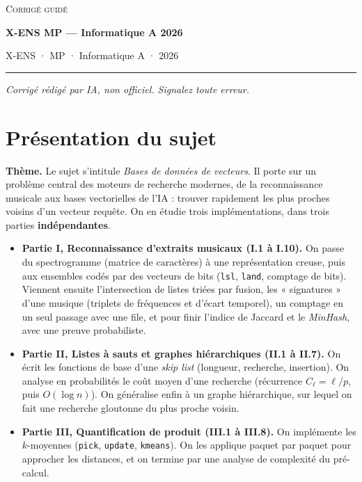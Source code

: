 \documentclass[11pt,a4paper]{article}
\providecommand{\tightlist}{\setlength{\itemsep}{0pt}\setlength{\parskip}{0pt}}
\begin{document}
\thispagestyle{plain}
\begin{center}
  {\small\scshape Corrigé guidé}\par\smallskip
  {\LARGE\bfseries X-ENS MP — Informatique A 2026\par}\medskip
  {\large X-ENS · MP · Informatique A · 2026\par}
\end{center}
\vspace{2pt}\hrule\vspace{8pt}

\emph{Corrigé rédigé par IA, non officiel. Signalez toute erreur.}

\hypertarget{pruxe9sentation-du-sujet}{%
\section{Présentation du sujet}\label{pruxe9sentation-du-sujet}}

\textbf{Thème.} Le sujet s'intitule \emph{Bases de données de vecteurs}. Il porte sur un problème central des moteurs de recherche modernes, de la reconnaissance musicale aux bases vectorielles de l'IA : trouver rapidement les plus proches voisins d'un vecteur requête. On en étudie trois implémentations, dans trois parties \textbf{indépendantes}.

\begin{itemize}
\tightlist
\item
  \textbf{Partie I, Reconnaissance d'extraits musicaux (I.1 à I.10).} On passe du spectrogramme (matrice de caractères) à une représentation creuse, puis aux ensembles codés par des vecteurs de bits (\texttt{lsl}, \texttt{land}, comptage de bits). Viennent ensuite l'intersection de listes triées par fusion, les « signatures » d'une musique (triplets de fréquences et d'écart temporel), un comptage en un seul passage avec une file, et pour finir l'indice de Jaccard et le \emph{MinHash}, avec une preuve probabiliste.
\item
  \textbf{Partie II, Listes à sauts et graphes hiérarchiques (II.1 à II.7).} On écrit les fonctions de base d'une \emph{skip list} (longueur, recherche, insertion). On analyse en probabilités le coût moyen d'une recherche (récurrence \(C_\ell=\ell/p\), puis \(O(\log n)\)). On généralise enfin à un graphe hiérarchique, sur lequel on fait une recherche gloutonne du plus proche voisin.
\item
  \textbf{Partie III, Quantification de produit (III.1 à III.8).} On implémente les \(k\)-moyennes (\texttt{pick}, \texttt{update}, \texttt{kmeans}). On les applique paquet par paquet pour approcher les distances, et on termine par une analyse de complexité du pré-calcul.
\end{itemize}
\end{document}
